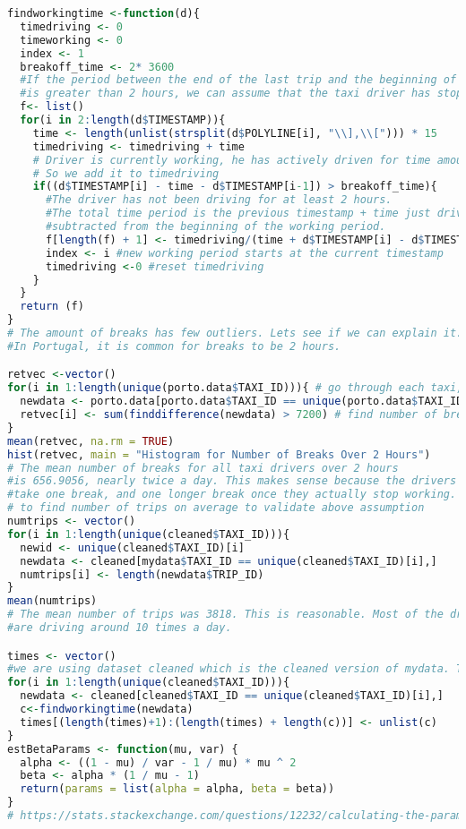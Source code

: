 \documentclass{article}
\begin{document}
\begin{lstlisting}[language=R]
findworkingtime <-function(d){
  timedriving <- 0
  timeworking <- 0
  index <- 1
  breakoff_time <- 2* 3600
  #If the period between the end of the last trip and the beginning of the next
  #is greater than 2 hours, we can assume that the taxi driver has stopped working
  f<- list()
  for(i in 2:length(d$TIMESTAMP)){
    time <- length(unlist(strsplit(d$POLYLINE[i], "\\],\\["))) * 15 
    timedriving <- timedriving + time 
    # Driver is currently working, he has actively driven for time amount
    # So we add it to timedriving
    if((d$TIMESTAMP[i] - time - d$TIMESTAMP[i-1]) > breakoff_time){ 
      #The driver has not been driving for at least 2 hours.
      #The total time period is the previous timestamp + time just driven
      #subtracted from the beginning of the working period.
      f[length(f) + 1] <- timedriving/(time + d$TIMESTAMP[i] - d$TIMESTAMP[index])# the index is where our period starts
      index <- i #new working period starts at the current timestamp
      timedriving <-0 #reset timedriving
    }
  }
  return (f)
}
# The amount of breaks has few outliers. Lets see if we can explain it.
#In Portugal, it is common for breaks to be 2 hours.

retvec <-vector()
for(i in 1:length(unique(porto.data$TAXI_ID))){ # go through each taxi, and find the amount of working time
  newdata <- porto.data[porto.data$TAXI_ID == unique(porto.data$TAXI_ID)[i],]
  retvec[i] <- sum(finddifference(newdata) > 7200) # find number of breaks for each taxi that are above 7200
}
mean(retvec, na.rm = TRUE)
hist(retvec, main = "Histogram for Number of Breaks Over 2 Hours")
# The mean number of breaks for all taxi drivers over 2 hours
#is 656.9056, nearly twice a day. This makes sense because the drivers will
#take one break, and one longer break once they actually stop working. (go home)
# to find number of trips on average to validate above assumption
numtrips <- vector()
for(i in 1:length(unique(cleaned$TAXI_ID))){
  newid <- unique(cleaned$TAXI_ID)[i]
  newdata <- cleaned[mydata$TAXI_ID == unique(cleaned$TAXI_ID)[i],]
  numtrips[i] <- length(newdata$TRIP_ID)
}
mean(numtrips)
# The mean number of trips was 3818. This is reasonable. Most of the drivers
#are driving around 10 times a day.

times <- vector()
#we are using dataset cleaned which is the cleaned version of mydata. The cleaning was done in p4.r.
for(i in 1:length(unique(cleaned$TAXI_ID))){
  newdata <- cleaned[cleaned$TAXI_ID == unique(cleaned$TAXI_ID)[i],]
  c<-findworkingtime(newdata)
  times[(length(times)+1):(length(times) + length(c))] <- unlist(c)
}
estBetaParams <- function(mu, var) {
  alpha <- ((1 - mu) / var - 1 / mu) * mu ^ 2
  beta <- alpha * (1 / mu - 1)
  return(params = list(alpha = alpha, beta = beta))
}
# https://stats.stackexchange.com/questions/12232/calculating-the-parameters-of-a-beta-distribution-using-the-mean-and-variance


\end{lstlisting}
\end{document}
